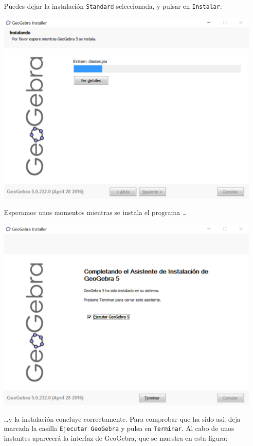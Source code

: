 \documentclass[10pt,a4paper]{article}\usepackage[]{graphicx}\usepackage[]{color}
\begin{document}
Puedes dejar la instalación {\tt Standard} seleccionada, y pulsar en {\tt Instalar}:
    \begin{center}
    \includegraphics[width=14cm]{../fig/Tut00-GeoGebraSetup04-201605.png}
    \end{center}
Esperamos unos momentos mientras se instala el programa \ldots
    \begin{center}
    \includegraphics[width=14cm]{../fig/Tut00-GeoGebraSetup05-201605.png}
    \end{center}
\ldots y la instalación concluye correctamente. Para comprobar que ha sido así, deja marcada la
casilla {\tt Ejecutar GeoGebra} y pulsa en {\tt Terminar}. Al cabo de unos instantes aparecerá la
interfaz de GeoGebra, que se muestra en esta figura:
\end{document}
